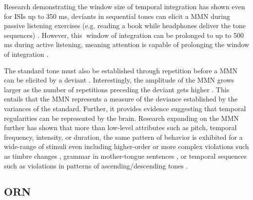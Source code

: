 \documentclass[a4paper,11pt,final]{ThesisStyle}
\begin{document}
Research demonstrating the window size of temporal integration has shown even for ISIs up to 350 ms, deviants in sequential tones can elicit a MMN during passive listening exercises (e.g. reading a book while headphones deliver the tone sequences) \cite{Tervaniemi1994,Tervaniemi1997}.  However, this window of integration can be prolonged to up to 500 ms during active listening, meaning attention is capable of prolonging the window of integration \cite{Kanoh2001}.  

The standard tone must also be established through repetition before a MMN can be elicited by a deviant \cite{Cowan1988}.  Interestingly, the amplitude of the MMN grows larger as the number of repetitions preceding the deviant gets higher \cite{Sams1983}.  This entails that the MMN represents a measure of the deviance established by the variances of the standard.   Further, it provides evidence suggesting that temporal regularities can be represented by the brain.  Research expanding on the MMN further has shown that more than low-level attributes such as pitch, temporal frequency, intensity, or duration, the same pattern of behavior is exhibited for a wide-range of stimuli even including higher-order or more complex violations such as timbre changes \cite{Tervaniemi1997a}, grammar in mother-tongue sentences \cite{Naatanen2001a}, or temporal sequences such as violations in patterns of ascending/descending tones \cite{Naatanen2007a,Garrido2009,Shamma2010}.


\subsection{ORN}
\end{document}

